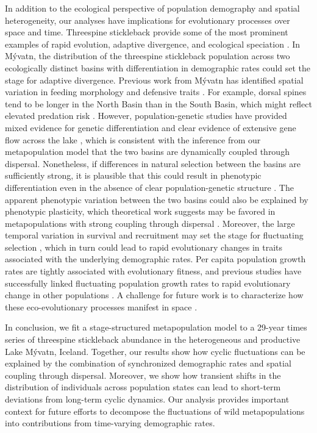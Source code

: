 \documentclass[11pt]{article}
\begin{document}
In addition to the ecological perspective 
of population demography and spatial heterogeneity, 
our analyses have implications for evolutionary processes over space and time. 
Threespine stickleback provide some of the most prominent examples of rapid evolution, 
adaptive divergence, and ecological speciation \citep[reviewed in][]{hendry2013stickleback}. 
In M\'{y}vatn, the distribution of the threespine stickleback population across 
two ecologically distinct basins with differentiation in demographic rates 
could set the stage for adaptive divergence. 
Previous work from M\'{y}vatn has identified spatial variation 
in feeding morphology and defensive traits \citep{millet2013}. 
For example, dorsal spines tend to be longer in the North Basin than in the South Basin,
which might reflect elevated predation risk
\citep{hoogland1956spines, reimchen2002temporal}. 
However, population-genetic studies have provided mixed evidence 
for genetic differentiation and clear evidence of extensive gene flow 
across the lake \citep{olafsdottir2007postglacial, millet2013}, 
which is consistent with the inference from our metapopulation model that the two basins 
are dynamically coupled through dispersal. 
Nonetheless, if differences in natural selection between the basins are sufficiently strong, 
it is plausible that this could result in phenotypic differentiation 
even in the absence of clear population-genetic structure 
\citep{rasanen2008disentangling}. 
The apparent phenotypic variation between the two basins 
could also be explained by phenotypic plasticity, 
which theoretical work suggests may be favored in metapopulations 
with strong coupling through dispersal \citep{sultan2002metapopulation}. 
Moreover, the large temporal variation in survival and recruitment may set the stage 
for fluctuating selection \citep{siepielski2009s}, 
which in turn could lead to rapid evolutionary changes in traits associated 
with the underlying demographic rates. 
Per capita population growth rates are tightly associated with evolutionary fitness, 
and previous studies have successfully linked fluctuating population growth rates 
to rapid evolutionary change in other populations 
\citep{coulson2008dynamics, engen2014estimating, de2019stage}.
A challenge for future work is to characterize how these eco-evolutionary processes
manifest in space
\citep{hanski2012eco, brunner2019diversity}.

In conclusion, we fit a stage-structured metapopulation model to a 29-year times series 
of threespine stickleback abundance in the heterogeneous 
and productive Lake M\'{y}vatn, Iceland. 
Together, our results show how cyclic fluctuations can be explained by the combination of synchronized demographic rates and spatial coupling through dispersal. 
Moreover, we show how transient shifts in the distribution of individuals 
across population states can lead to short-term deviations 
from long-term cyclic dynamics.
Our analysis provides important context for future efforts to decompose 
the fluctuations of wild metapopulations 
into contributions from time-varying demographic rates.
\end{document}
